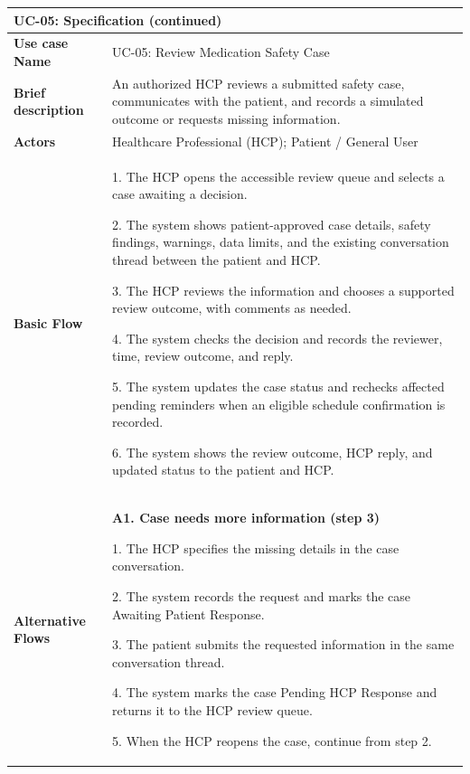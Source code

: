 \begin{longtable}{|p{}|p{}|}
\hline
\endfirsthead
\multicolumn{2}{l}{\textbf{UC-05: Specification (continued)}} \\
\hline
\endhead
\textbf{Use case Name} & UC-05: Review Medication Safety Case \\ \hline

\textbf{Brief description} &
An authorized HCP reviews a submitted safety case, communicates with the patient, and records a simulated outcome or requests missing information.
\\ \hline

\textbf{Actors} &
Healthcare Professional (HCP); Patient / General User
\\ \hline

\textbf{Basic Flow} &
1. The HCP opens the accessible review queue and selects a case awaiting a decision.\par
2. The system shows patient-approved case details, safety findings, warnings, data limits, and the existing conversation thread between the patient and HCP.\par
3. The HCP reviews the information and chooses a supported review outcome, with comments as needed.\par
4. The system checks the decision and records the reviewer, time, review outcome, and reply.\par
5. The system updates the case status and rechecks affected pending reminders when an eligible schedule confirmation is recorded.\par
6. The system shows the review outcome, HCP reply, and updated status to the patient and HCP.
\\ \hline

\textbf{Alternative Flows} &

\textbf{A1. Case needs more information (step 3)}\par
1. The HCP specifies the missing details in the case conversation.\par
2. The system records the request and marks the case Awaiting Patient Response.\par
3. The patient submits the requested information in the same conversation thread.\par
4. The system marks the case Pending HCP Response and returns it to the HCP review queue.\par
5. When the HCP reopens the case, continue from step 2.


\end{longtable}
